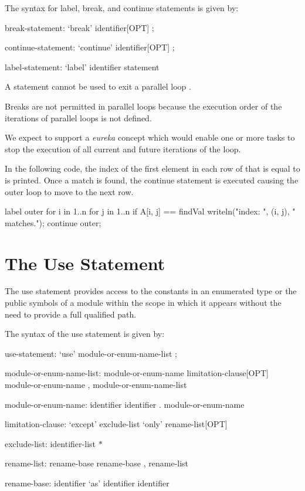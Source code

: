 The syntax for label, break, and continue statements is given by:
\begin{syntax}
break-statement:
  `break' identifier[OPT] ;

continue-statement:
  `continue' identifier[OPT] ;

label-statement:
  `label' identifier statement
\end{syntax}

A  statement cannot be used to exit a parallel loop .

\begin{rationale}
Breaks are not permitted in parallel loops because the execution order
of the iterations of parallel loops is not defined.
\end{rationale}

\begin{future}
We expect to support a \emph{eureka} concept which would enable one or
more tasks to stop the execution of all current and future iterations
of the loop.
\end{future}

\begin{example}
In the following code, the index of the first element in each row of
 that is equal to  is printed.  Once a match is
found, the continue statement is executed causing the outer loop to
move to the next row.
\begin{chapel}
label outer for i in 1..n {
  for j in 1..n {
    if A[i, j] == findVal {
      writeln("index: ", (i, j), " matches.");
      continue outer;
    }
  }
}
\end{chapel}
\end{example}

\section{The Use Statement}
\label{The_Use_Statement}

The use statement provides access to the constants in an enumerated type or
the public symbols of a module within the scope in which it appears without
the need to provide a full qualified path.

The syntax of the use statement is given by:

\begin{syntax}
use-statement:
  `use' module-or-enum-name-list ;

module-or-enum-name-list:
  module-or-enum-name limitation-clause[OPT]
  module-or-enum-name , module-or-enum-name-list

module-or-enum-name:
  identifier
  identifier . module-or-enum-name

limitation-clause:
  `except' exclude-list
  `only' rename-list[OPT]

exclude-list:
  identifier-list
  $ * $

rename-list:
  rename-base
  rename-base , rename-list

rename-base:
  identifier `as' identifier
  identifier
\end{syntax}

